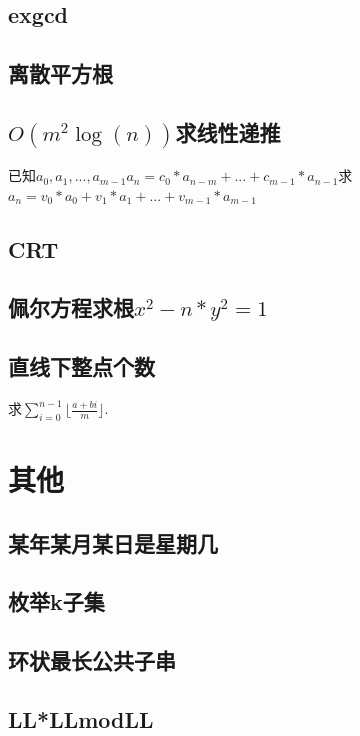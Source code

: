 \documentclass[landscape,a4paper]{article}
\begin{document}
\begin{spacing}{0.3}
\begin{multicols}{2}
	\subsection{exgcd}
	
	\subsection{离散平方根}
	
	\subsection{$O(m^2 \log(n))$求线性递推}
	已知$a_0, a_1, ..., a_{m - 1}$$a_n = c_0 * a_{n - m} + ... + c_{m - 1} * a_{n - 1}$求$a_n = v_0 * a_0 + v_1 * a_1 + ... + v_{m - 1} * a_{m - 1}$
	
	\subsection{CRT}
	
	\subsection{佩尔方程求根$x^2-n*y^2=1$}
	
	\subsection{直线下整点个数}
	求$\displaystyle\sum_{i=0}^{n-1} \lfloor\frac{a+bi}{m}\rfloor$.
	
	
	
	
	
	\section{其他}
	\subsection{某年某月某日是星期几}
	
	\subsection{枚举k子集}
	
	\subsection{环状最长公共子串}
	
	\subsection{LL*LLmodLL}
	

\end{multicols}
\end{spacing}
\end{document}
